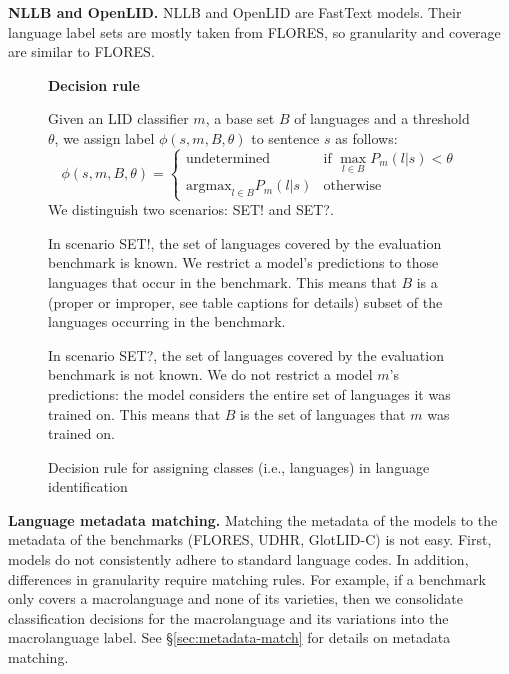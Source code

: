 \documentclass[11pt]{article}
\newcommand{\basequ}{SET?\xspace}
\newcommand{\baseex}{SET!\xspace}
\def\argmax{\mbox{argmax}}
\def\corpusname{\mbox{GlotLID-C}\xspace}
\def\macrolanguage{macrolanguage\xspace}
\def\flores{FLORES\xspace}
\def\udhr{UDHR\xspace}
\def\edin{OpenLID\xspace}
\def\nllb{NLLB\xspace}
\def\figlabel#1{\label{fig:#1}\label{p:#1}}
\def\secref#1{\S\ref{sec:#1}}
\begin{document}
\textbf{\nllb and \edin.} \nllb and \edin are
FastText
models. Their language label sets are mostly taken from
\flores, so granularity and coverage are similar to \flores.



\begin{figure*}
\centering
\begin{minipage}[t]{\textwidth}
\small
\textbf{Decision rule}

\smallskip

Given an LID classifier $m$, a base set $B$ of languages and
a threshold $\theta$, we assign label $\phi(s,m,B,\theta)$ to
sentence $s$ as follows:
\begin{equation*}
  \phi(s,m,B,\theta)=\begin{cases}
      \text{undetermined} & \text{if $\max_{l \in B}P_{m}(l|s)<\theta$}\\
 \argmax_{l \in B}  P_{m}(l|s)
           & \text{otherwise}
            \end{cases}
            \end{equation*}
           We distinguish two scenarios: \baseex and \basequ.

\smallskip

In scenario \baseex, the set of languages covered
      by the evaluation benchmark is
      known. We restrict a model's predictions to those languages that
      occur in the benchmark. This means that $B$ is a
      (proper or improper, see table captions for details)
      subset of the languages occurring in the benchmark.

\smallskip

In scenario \basequ, the set of languages covered by the
      evaluation benchmark is not known. We do not restrict
      a model $m$'s
      predictions: the model considers the entire set of
      languages it was trained on. This means that $B$ is
      the set of languages that $m$ was trained on.

\smallskip


\end{minipage}
\caption{\figlabel{decisionrule}Decision rule for assigning classes (i.e.,
      languages) in language identification}
\end{figure*}

\textbf{Language metadata matching.}
Matching the metadata
of the models to the metadata of the  benchmarks
(\flores, \udhr, \corpusname) is  not easy.
First, models do not consistently adhere to standard language
codes.
In addition, differences in granularity require
matching rules. For example, if a benchmark only covers
a \macrolanguage and none of its varieties, then
we consolidate classification decisions for the \macrolanguage and
its variations into the \macrolanguage label.
See \secref{metadata-match} for details on
metadata matching.
\end{document}

